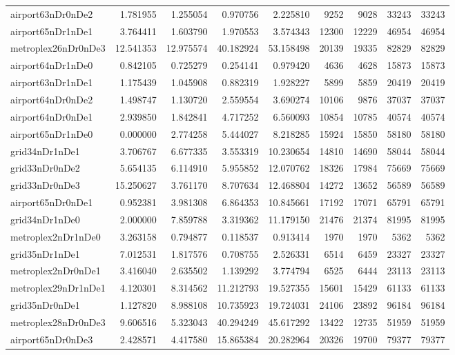 \begin{longtable}{|l|r|r|r|r|r|r|r|r|}
airport63nDr0nDe2 & 1.781955 & 1.255054 & 0.970756 & 2.225810 & 9252 & 9028 & 33243 & 33243 \\
airport65nDr1nDe1 & 3.764411 & 1.603790 & 1.970553 & 3.574343 & 12300 & 12229 & 46954 & 46954 \\
metroplex26nDr0nDe3 & 12.541353 & 12.975574 & 40.182924 & 53.158498 & 20139 & 19335 & 82829 & 82829 \\
airport64nDr1nDe0 & 0.842105 & 0.725279 & 0.254141 & 0.979420 & 4636 & 4628 & 15873 & 15873 \\
airport63nDr1nDe1 & 1.175439 & 1.045908 & 0.882319 & 1.928227 & 5899 & 5859 & 20419 & 20419 \\
airport64nDr0nDe2 & 1.498747 & 1.130720 & 2.559554 & 3.690274 & 10106 & 9876 & 37037 & 37037 \\
airport64nDr0nDe1 & 2.939850 & 1.842841 & 4.717252 & 6.560093 & 10854 & 10785 & 40574 & 40574 \\
airport65nDr1nDe0 & 0.000000 & 2.774258 & 5.444027 & 8.218285 & 15924 & 15850 & 58180 & 58180 \\
grid34nDr1nDe1 & 3.706767 & 6.677335 & 3.553319 & 10.230654 & 14810 & 14690 & 58044 & 58044 \\
grid33nDr0nDe2 & 5.654135 & 6.114910 & 5.955852 & 12.070762 & 18326 & 17984 & 75669 & 75669 \\
grid33nDr0nDe3 & 15.250627 & 3.761170 & 8.707634 & 12.468804 & 14272 & 13652 & 56589 & 56589 \\
airport65nDr0nDe1 & 0.952381 & 3.981308 & 6.864353 & 10.845661 & 17192 & 17071 & 65791 & 65791 \\
grid34nDr1nDe0 & 2.000000 & 7.859788 & 3.319362 & 11.179150 & 21476 & 21374 & 81995 & 81995 \\
metroplex2nDr1nDe0 & 3.263158 & 0.794877 & 0.118537 & 0.913414 & 1970 & 1970 & 5362 & 5362 \\
grid35nDr1nDe1 & 7.012531 & 1.817576 & 0.708755 & 2.526331 & 6514 & 6459 & 23327 & 23327 \\
metroplex2nDr0nDe1 & 3.416040 & 2.635502 & 1.139292 & 3.774794 & 6525 & 6444 & 23113 & 23113 \\
metroplex29nDr1nDe1 & 4.120301 & 8.314562 & 11.212793 & 19.527355 & 15601 & 15429 & 61133 & 61133 \\
grid35nDr0nDe1 & 1.127820 & 8.988108 & 10.735923 & 19.724031 & 24106 & 23892 & 96184 & 96184 \\
metroplex28nDr0nDe3 & 9.606516 & 5.323043 & 40.294249 & 45.617292 & 13422 & 12735 & 51959 & 51959 \\
airport65nDr0nDe3 & 2.428571 & 4.417580 & 15.865384 & 20.282964 & 20326 & 19700 & 79377 & 79377 \\

\end{longtable}
